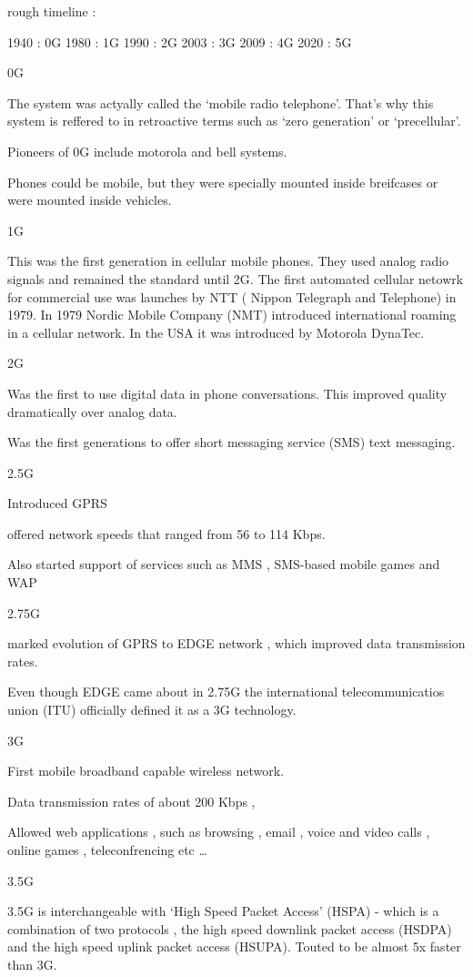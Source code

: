 rough timeline :

1940 : 0G
1980 : 1G
1990 : 2G
2003 : 3G
2009 : 4G
2020 : 5G

0G

The system was actyally called the `mobile radio telephone'. That's why this
system is reffered to in retroactive terms such as `zero generation' or
`precellular'.

Pioneers of 0G include motorola and bell systems.

Phones could be mobile, but they were specially mounted inside breifcases or
were mounted inside vehicles.


1G

This was the first generation in cellular mobile phones. They used analog radio
signals and remained the standard until 2G. The first automated cellular netowrk
for commercial use was launches by NTT ( Nippon Telegraph and Telephone) in
1979. In 1979 Nordic Mobile Company (NMT) introduced international roaming in a
cellular network. In the USA it was introduced by Motorola DynaTec.

2G

Was the first to use digital data in phone conversations. This improved quality
dramatically over analog data.

Was the first generations to offer short messaging service (SMS) text messaging.

2.5G

Introduced GPRS

offered network speeds that ranged from 56 to 114 Kbps.

Also started support of services such as MMS , SMS-based mobile games and WAP


2.75G

marked evolution of GPRS to EDGE network , which improved data transmission
rates.

Even though EDGE came about in 2.75G the international telecommunicatios union
(ITU) officially defined it as a 3G technology.


3G

First mobile broadband capable wireless network.

Data transmission rates of about 200 Kbps ,

Allowed web applications , such as browsing , email , voice and video calls ,
online games , teleconfrencing etc \ldots

3.5G

3.5G is interchangeable with `High Speed Packet Access' (HSPA) - which is a
combination of two protocols , the high speed downlink packet access (HSDPA) and
the high speed uplink packet access (HSUPA). Touted to be almost 5x faster than
3G.

